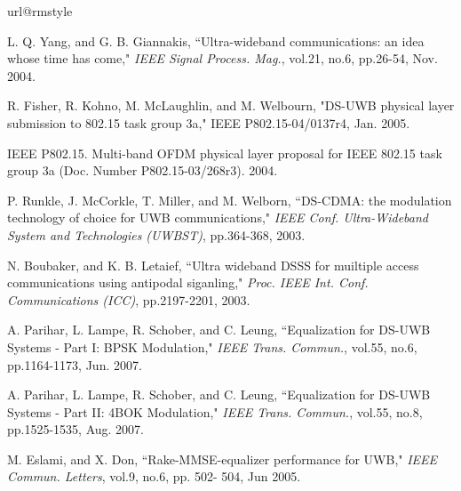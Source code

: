 \documentclass[journal]{IEEEtran}
\begin{document}
\begin{thebibliography}{10}
\providecommand{\url}[1]{#1} \csname url@rmstyle\endcsname
\providecommand{\newblock}{\relax} \providecommand{\bibinfo}[2]{#2}
\providecommand\BIBentrySTDinterwordspacing{\spaceskip=0pt\relax}
\providecommand\BIBentryALTinterwordstretchfactor{4}
\providecommand\BIBentryALTinterwordspacing{\spaceskip=\fontdimen2\font
plus \BIBentryALTinterwordstretchfactor\fontdimen3\font minus
  \fontdimen4\font\relax}
\providecommand\BIBforeignlanguage[2]{{\expandafter\ifx\csname l@#1\endcsname\relax
\typeout{** WARNING: IEEEtran.bst: No hyphenation pattern has been}\typeout{** loaded for the language `#1'. Using the pattern for}\typeout{** the default language instead.}\else \language=\csname l@#1\endcsname \fi #2}}



L. Q. Yang, and G. B. Giannakis, ``Ultra-wideband communications: an
idea whose time has come," {\it IEEE Signal Process. Mag.}, vol.21,
no.6, pp.26-54, Nov. 2004.

R. Fisher, R. Kohno, M. McLaughlin, and M. Welbourn, "DS-UWB
physical layer submission to 802.15 task group 3a," IEEE
P802.15-04/0137r4, Jan. 2005.

IEEE P802.15. Multi-band OFDM physical layer proposal for IEEE
802.15 task group 3a (Doc. Number P802.15-03/268r3). 2004.

P. Runkle, J. McCorkle, T. Miller, and M. Welborn, ``DS-CDMA: the
modulation technology of choice for UWB communications," {\it IEEE
Conf. Ultra-Wideband System and Technologies (UWBST)}, pp.364-368,
2003.

N. Boubaker, and K. B. Letaief, ``Ultra wideband DSSS for muiltiple
access communications using antipodal siganling," {\it Proc. IEEE
Int. Conf. Communications (ICC)}, pp.2197-2201, 2003.

A. Parihar, L. Lampe, R. Schober, and C. Leung, ``Equalization for
DS-UWB Systems - Part I: BPSK Modulation," {\it IEEE Trans.
Commun.}, vol.55, no.6, pp.1164-1173, Jun. 2007.

A. Parihar, L. Lampe, R. Schober, and C. Leung, ``Equalization for
DS-UWB Systems - Part II: 4BOK Modulation," {\it IEEE Trans.
Commun.}, vol.55, no.8, pp.1525-1535, Aug. 2007.

M. Eslami, and X. Don, ``Rake-MMSE-equalizer performance for UWB,"
{\it IEEE Commun. Letters}, vol.9, no.6, pp. 502- 504, Jun 2005.


\end{thebibliography}
\end{document}
